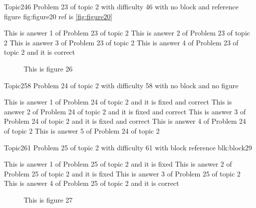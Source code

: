 \documentclass[master]{exam}
\begin{document}
\begin{problem}{Topic2}{46}
	Problem 23 of topic 2 with difficulty 46 with no block and reference figure fig:figure20 ref is \ref{fig:figure20}
	\begin{answers}
		\answer This is answer 1 of Problem 23 of topic 2 
		\answer This is answer 2 of Problem 23 of topic 2 
		\answer This is answer 3 of Problem 23 of topic 2 
		\answer[correct] This is answer 4 of Problem 23 of topic 2 and it is correct
	\end{answers}
\end{problem}



\begin{figure}
	\begin{center}
		This is figure 26 
		\label{fig:figure26}
	\end{center}
\end{figure}

\begin{problem}{Topic2}{58}
	Problem 24 of topic 2 with difficulty 58 with no block and no figure
	\begin{answers}
		 This is answer 1 of Problem 24 of topic 2 and it is fixed and correct
		 This is answer 2 of Problem 24 of topic 2 and it is fixed and correct
		 This is answer 3 of Problem 24 of topic 2 and it is fixed and correct
		\answer This is answer 4 of Problem 24 of topic 2 
		\answer This is answer 5 of Problem 24 of topic 2 
	\end{answers}
\end{problem}

\begin{problem}[requires=blk:block29]{Topic2}{61}
	Problem 25 of topic 2 with difficulty 61 with block reference blk:block29
	\begin{answers}
		\answer[fixed] This is answer 1 of Problem 25 of topic 2 and it is fixed
		\answer[fixed] This is answer 2 of Problem 25 of topic 2 and it is fixed
		\answer This is answer 3 of Problem 25 of topic 2 
		\answer[correct] This is answer 4 of Problem 25 of topic 2 and it is correct
	\end{answers}
\end{problem}



\begin{figure}
	\begin{center}
		This is figure 27 
		\label{fig:figure27}
	\end{center}
\end{figure}
\end{document}
